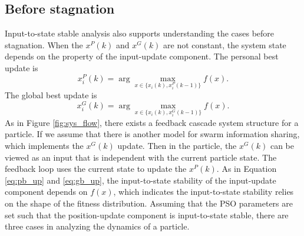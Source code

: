 \documentclass{sig-alternate}
\begin{document}
\subsection{Before stagnation}

Input-to-state stable analysis also supports understanding the cases before stagnation.
When the $ x^{P}(k) $ and $ x^{G}(k) $ are not constant, the system state depends on the property of the input-update component.
The personal best update is
\begin{equation}
\label{eq:pb_up}
x_{i}^{P}(k) = \arg \max_{ x \in \{ x_{i}(k), x_{i}^{P}(k-1) \} } f(x).
\end{equation}
The global best update is
\begin{equation}
\label{eq:gb_up}
x_{i}^{G}(k) = \arg \max_{ x \in \{ x_{i}(k), x_{i}^{G}(k-1) \} } f(x).
\end{equation}
As in Figure \ref{fig:sys_flow}, there exists a feedback cascade system structure for a particle.
If we assume that there is another model for swarm information sharing, which implements the $ x^{G}(k) $ update.
Then in the particle, the $ x^{G}(k) $ can be viewed as an input that is independent with the current particle state.
The feedback loop uses the current state to update the $ x^{P}(k) $.
As in Equation \eqref{eq:pb_up} and \eqref{eq:gb_up}, the input-to-state stability of the input-update component depends on $ f(x) $, which indicates the input-to-state stability relies on the shape of the fitness distribution.
Assuming that the PSO parameters are set such that the position-update component is input-to-state stable, there are three cases in analyzing the dynamics of a particle.
\end{document}
